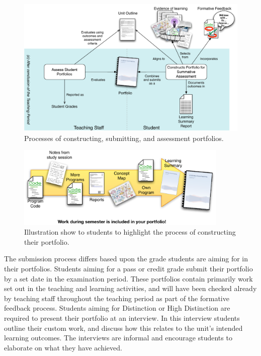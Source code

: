 \begin{figure}[p]
	\centering
	\includegraphics[width=\textwidth]{PortfolioConstructionAssessment}
	\caption{Processes of constructing, submitting, and assessment portfolios.}
	\label{fig:portfolio_processes}
\end{figure}

\begin{figure}[p]
	\centering
	\includegraphics[width=0.9\textwidth]{PortfolioPieces}
	\caption{Illustration show to students to highlight the process of constructing their portfolio.}
	\label{fig:portfolio_pieces}
\end{figure}

The submission process differs based upon the grade students are aiming for in their portfolios. Students aiming for a pass or credit grade submit their portfolio by a set date in the examination period. These portfolios contain primarily work set out in the teaching and learning activities, and will have been checked already by teaching staff throughout the teaching period as part of the formative feedback process. Students aiming for Distinction or High Distinction are required to present their portfolio at an interview. In this interview students outline their custom work, and discuss how this relates to the unit's intended learning outcomes. The interviews are informal and encourage students to elaborate on what they have achieved.

